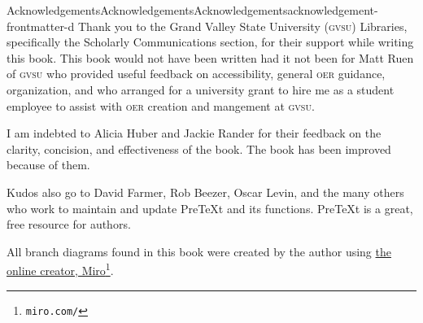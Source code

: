 \documentclass[oneside,10pt,]{book}
\newcommand{\initialism}[1]{\textsc{\MakeLowercase{#1}}}
\begin{document}
%
\begin{acknowledgement}{Acknowledgements}{Acknowledgements}{}{Acknowledgements}{}{}{acknowledgement-frontmatter-d}
Thank you to the Grand Valley State University (\initialism{GVSU}) Libraries, specifically the Scholarly Communications section, for their support while writing this book. This book would not have been written had it not been for Matt Ruen of \initialism{GVSU} who provided useful feedback on accessibility, general \initialism{OER} guidance, organization, and who arranged for a university grant to hire me as a student employee to assist with \initialism{OER} creation and mangement at \initialism{GVSU}.%
\par
I am indebted to Alicia Huber and Jackie Rander for their feedback on the clarity, concision, and effectiveness of the book. The book has been improved because of them.%
\par
Kudos also go to David Farmer, Rob Beezer, Oscar Levin, and the many others who work to maintain and update PreTeXt and its functions. PreTeXt is a great, free resource for authors.%
\par
All branch diagrams found in this book were created by the author using \href{https://miro.com/}{the online creator, Miro}\footnote{\nolinkurl{miro.com/}\label{fn-frontmatter-d-d-b}}.%
\end{acknowledgement}
%
%
\typeout{************************************************}
\typeout{************************************************}
%
\end{document}
